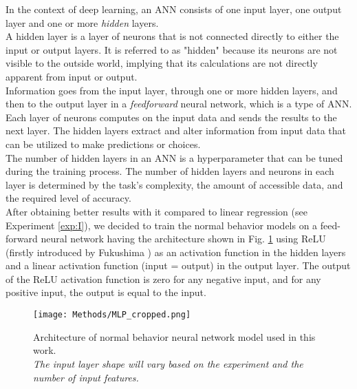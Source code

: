     In the context of deep learning, an ANN consists of one input layer, one output layer and one or more \emph{hidden} layers.\\
    A hidden layer is a layer of neurons that is not connected directly to either the input or output layers. 
    It is referred to as "hidden" because its neurons are not visible to the outside world, implying that its calculations are not directly apparent from input or output.\\
    Information goes from the input layer, through one or more hidden layers, and then to the output layer in a \emph{feedforward} neural network, which is a type of ANN. 
    Each layer of neurons computes on the input data and sends the results to the next layer. The hidden layers extract and alter information from input data that can be 
    utilized to make predictions or choices.\\
    The number of hidden layers in an ANN is a hyperparameter that can be tuned during the training process.
    The number of hidden layers and neurons in each layer is determined by the task's complexity, the amount of accessible data, and the required level of accuracy.\\
    After obtaining better results with it compared to linear regression (see Experiment \ref{exp:I}), we decided to train the normal behavior models
    on a feed-forward neural network having the architecture shown in Fig. \ref{fig:MLP} using ReLU (firstly introduced by Fukushima \cite{Fukushima}) 
    as an activation function in the hidden layers and a linear activation function (input = output) in the output layer. 
    The output of the ReLU activation function is zero for any negative input, and for any positive input, the output is equal to the input.

    \begin{figure}[H]
      \begin{center}
        \texttt{[image: Methods/MLP\_cropped.png]}
      \end{center}
      \caption{Architecture of normal behavior neural network model used in this work. \\
      \emph{The input layer shape will vary based on the experiment and the number of input features.}}
      \label{fig:MLP}
    \end{figure}

